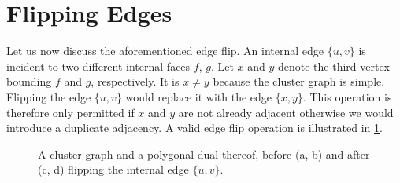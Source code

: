 \section{Flipping Edges}
\label{sect:flipping-edges}

Let us now discuss the aforementioned edge flip. An internal edge $\{u,v\}$ is incident to two different internal faces $f$, $g$. Let $x$ and $y$ denote the third vertex bounding $f$ and $g$, respectively. It is $x \neq y$ because the cluster graph is simple. Flipping the edge $\{u,v\}$ would replace it with the edge $\{x,y\}$. This operation is therefore only permitted if $x$ and $y$ are not already adjacent \emdash{} otherwise we would introduce a duplicate adjacency. A valid edge flip operation is illustrated in \cref{fig:flip-edge-example-internal}.


\begin{figure}[H]
	\centering
	\quad
	\qquad
	\quad
	\caption{A cluster graph and a polygonal dual thereof, before (a, b) and after (c, d) flipping the internal edge $\{u,v\}$.}
	\label{fig:flip-edge-example-internal}
\end{figure}


